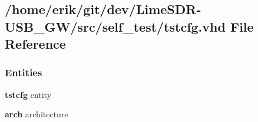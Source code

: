 \subsection{/home/erik/git/dev/\+Lime\+S\+D\+R-\/\+U\+S\+B\+\_\+\+G\+W/src/self\+\_\+test/tstcfg.vhd File Reference}
\label{self__test_2tstcfg_8vhd}
\subsubsection*{Entities}
\begin{DoxyCompactItemize}
\item 
{\bf tstcfg} entity
\item 
{\bf arch} architecture
\end{DoxyCompactItemize}
